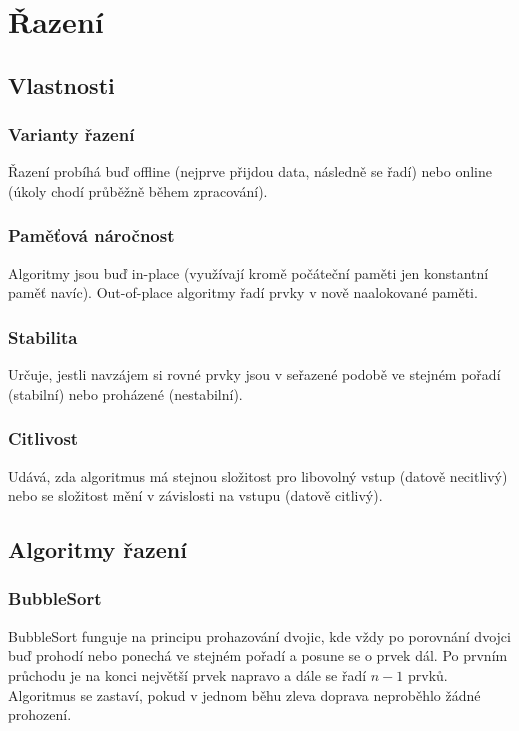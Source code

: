 \section{Řazení}

  \subsection{Vlastnosti}

    \subsubsection{Varianty řazení}
      Řazení probíhá buď offline (nejprve přijdou data, následně se řadí) nebo online (úkoly chodí průběžně během zpracování).

    \subsubsection{Paměťová náročnost}
      Algoritmy jsou buď in-place (využívají kromě počáteční paměti jen konstantní paměť navíc). Out-of-place algoritmy řadí prvky v nově naalokované paměti.

    \subsubsection{Stabilita}
      Určuje, jestli navzájem si rovné prvky jsou v seřazené podobě ve stejném pořadí (stabilní) nebo proházené (nestabilní).

    \subsubsection{Citlivost}
      Udává, zda algoritmus má stejnou složitost pro libovolný vstup (datově necitlivý) nebo se složitost mění v závislosti na vstupu (datově citlivý).

  \subsection{Algoritmy řazení}

    \subsubsection{BubbleSort}
      BubbleSort funguje na principu prohazování dvojic, kde vždy po porovnání dvojci buď prohodí nebo ponechá ve stejném pořadí a posune se o prvek dál.
      Po prvním průchodu je na konci největší prvek napravo a dále se řadí $n - 1$ prvků.
      Algoritmus se zastaví, pokud v jednom běhu zleva doprava neproběhlo žádné prohození.

